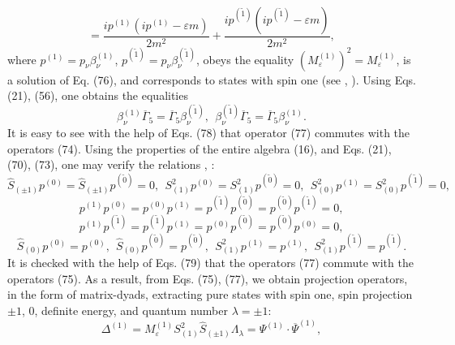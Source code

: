 \documentclass[a4paper,12pt]{article}
\begin{document}
\vspace{-8mm}
\begin{equation}  \label{77}
\end{equation}
\vspace{-8mm}
\[
=\frac{i p^{(1)}\left( i p^{(1)} - \varepsilon
m\right)}{2m^2}+\frac{i p^{(\widetilde{1})}\left( i
p^{(\widetilde{1})} - \varepsilon m\right)}{2m^2} ,
\]
where $p^{(1)}=  p_\nu \beta _\nu ^{(1)}$, $p^{(\widetilde{1})}=
p_\nu \beta _\nu ^{(\widetilde{1})}$, obeys the equality
$(M^{(1)}_\varepsilon )^2=M^{(1)}_\varepsilon $, is a solution of
Eq. (76), and corresponds to states with spin one (see
\cite{Kruglov1}, \cite{monogr}). Using Eqs. (21), (56), one
obtains the equalities
\begin{equation}
 \beta _\nu
^{(1)}\overline{\Gamma }_5=\overline{\Gamma }_5 \beta _\nu
^{(\widetilde{1})} ,~~\beta _\nu
^{(\widetilde{1})}\overline{\Gamma }_5=\overline{\Gamma }_5 \beta
_\nu ^{(1)} .
   \label{78}
\end{equation}
It is easy to see with the help of Eqs. (78) that operator (77)
commutes with the operators (74). Using the properties of the
entire algebra (16), and Eqs. (21), (70), (73), one may verify the
relations \cite{Kruglov1}, \cite{monogr}:
\[
\widehat{S}_{(\pm 1)}p^{( 0)}=\widehat{S}_{(\pm
1)}p^{(\widetilde{0})}=0 ,~~S_{(1)}^2 p^{(0)}=S_{(1)}^2
p^{(\widetilde{0})}=0 ,~~S_{(0)}^2 p^{(1)}=S_{(0)}^2
p^{(\widetilde{1})}=0 ,
\]
\[
p^{(1)}p^{(0)}=p^{(0)}p^{(1)}=p^{(\widetilde{1})}p^{(\widetilde{0})}
=p^{(\widetilde{0})}p^{(\widetilde{1})}=0 ,
\]
\vspace{-7mm}
\begin{equation}
\label{79}
\end{equation}
\vspace{-7mm}
\[
 p^{(1)}p^{(\widetilde{1})}=p^{(\widetilde{1})}p^{(1)}
=p^{(0)}p^{(\widetilde{0})}=p^{(\widetilde{0})}p^{(0)}=0 ,
\]
\[
\widehat{S}_{(0)}p^{( 0)}=p^{( 0)}
,~~\widehat{S}_{(0)}p^{(\widetilde{0})}=p^{(\widetilde{0})} ,~~
S_{(1)}^2 p^{(1)}=p^{(1)}
,~~S^2_{(1)}p^{(\widetilde{1})}=p^{(\widetilde{1})} .
\]
It is checked with the help of Eqs. (79) that the operators (77)
commute with the operators (75). As a result, from Eqs. (75),
(77), we obtain projection operators, in the form of matrix-dyads,
extracting pure states with spin one, spin projection $\pm 1$,
$0$, definite energy, and quantum number $\lambda=\pm 1$:
\[
\Delta ^{(1)}=M^{(1)}_\varepsilon S_{(1)}^2 \widehat{ S}_{(\pm
1)}\Lambda _\lambda = \Psi ^{(1)}\cdot \overline{ \Psi }^{(1)} ,
\]
\vspace{-7mm}
\end{document}
